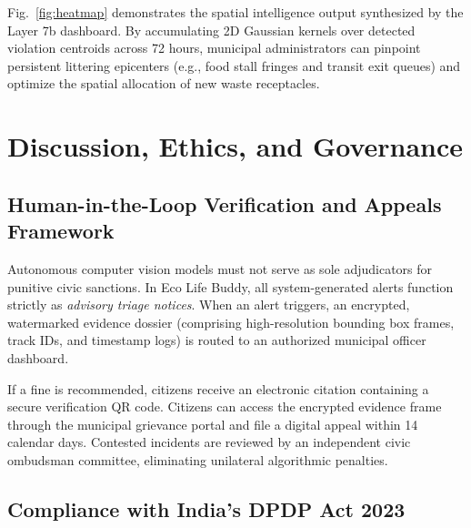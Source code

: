 \documentclass[conference]{IEEEtran}
\begin{document}
Fig.~\ref{fig:heatmap} demonstrates the spatial intelligence output synthesized by the Layer 7b dashboard. By accumulating 2D Gaussian kernels over detected violation centroids across 72 hours, municipal administrators can pinpoint persistent littering epicenters (e.g., food stall fringes and transit exit queues) and optimize the spatial allocation of new waste receptacles.

\section{Discussion, Ethics, and Governance}
\label{sec:discuss}

\subsection{Human-in-the-Loop Verification and Appeals Framework}

Autonomous computer vision models must not serve as sole adjudicators for punitive civic sanctions. In Eco Life Buddy, all system-generated alerts function strictly as \textit{advisory triage notices}. When an alert triggers, an encrypted, watermarked evidence dossier (comprising high-resolution bounding box frames, track IDs, and timestamp logs) is routed to an authorized municipal officer dashboard. 

If a fine is recommended, citizens receive an electronic citation containing a secure verification QR code. Citizens can access the encrypted evidence frame through the municipal grievance portal and file a digital appeal within 14 calendar days. Contested incidents are reviewed by an independent civic ombudsman committee, eliminating unilateral algorithmic penalties.

\subsection{Compliance with India's DPDP Act 2023}
\end{document}
